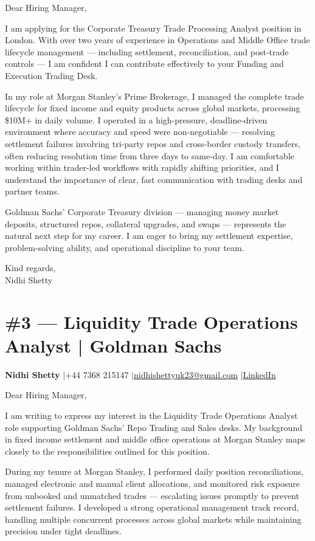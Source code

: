 \documentclass[11pt,a4paper]{article}
\makeatletter
\newcommand{\coverheader}{%
\begin{flushleft}
{\bfseries Nidhi Shetty} \enspace$\vert$\enspace +44 7368 215147 \enspace$\vert$\enspace \href{mailto:nidhishettyuk23@gmail.com}{nidhishettyuk23@gmail.com} \enspace$\vert$\enspace \href{https://www.linkedin.com/in/nidhi-shetty23-1841b7181}{LinkedIn}
\end{flushleft}
\vspace{4pt}
}
\makeatother
\begin{document}
Dear Hiring Manager,

I am applying for the Corporate Treasury Trade Processing Analyst position in London. With over two years of experience in Operations and Middle Office trade lifecycle management --- including settlement, reconciliation, and post-trade controls --- I am confident I can contribute effectively to your Funding and Execution Trading Desk.

In my role at Morgan Stanley's Prime Brokerage, I managed the complete trade lifecycle for fixed income and equity products across global markets, processing \$10M+ in daily volume. I operated in a high-pressure, deadline-driven environment where accuracy and speed were non-negotiable --- resolving settlement failures involving tri-party repos and cross-border custody transfers, often reducing resolution time from three days to same-day. I am comfortable working within trader-led workflows with rapidly shifting priorities, and I understand the importance of clear, fast communication with trading desks and partner teams.

Goldman Sachs' Corporate Treasury division --- managing money market deposits, structured repos, collateral upgrades, and swaps --- represents the natural next step for my career. I am eager to bring my settlement expertise, problem-solving ability, and operational discipline to your team.

\vspace{8pt}
Kind regards,\\
Nidhi Shetty

\newpage
\section{\#3 --- Liquidity Trade Operations Analyst | Goldman Sachs}
\coverheader

Dear Hiring Manager,

I am writing to express my interest in the Liquidity Trade Operations Analyst role supporting Goldman Sachs' Repo Trading and Sales desks. My background in fixed income settlement and middle office operations at Morgan Stanley maps closely to the responsibilities outlined for this position.

During my tenure at Morgan Stanley, I performed daily position reconciliations, managed electronic and manual client allocations, and monitored risk exposure from unbooked and unmatched trades --- escalating issues promptly to prevent settlement failures. I developed a strong operational management track record, handling multiple concurrent processes across global markets while maintaining precision under tight deadlines.
\end{document}
